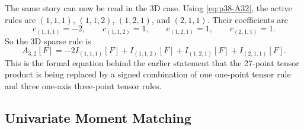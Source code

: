 \documentclass[11pt]{article}
\numberwithin{equation}{section}
\begin{document}
The same story can now be read in the 3D case.  Using
\eqref{eq:p38-A32}, the active rules are
\((1,1,1)\), \((1,1,2)\), \((1,2,1)\), and \((2,1,1)\).  Their coefficients are
\begin{equation}
  c_{(1,1,1)}=-2,
  \qquad
  c_{(1,1,2)}=1,
  \qquad
  c_{(1,2,1)}=1,
  \qquad
  c_{(2,1,1)}=1.
  \label{eq:p38-3d-smolyak-coeffs-repeat}
\end{equation}
So the 3D sparse rule is
\begin{equation}
  A_{3,2}[F]
  =
  -2I_{(1,1,1)}[F]+I_{(1,1,2)}[F]+I_{(1,2,1)}[F]+I_{(2,1,1)}[F].
  \label{eq:p38-3d-smolyak-rule}
\end{equation}
This is the formal equation behind the earlier statement that the 27-point tensor
product is being replaced by a signed combination of one one-point tensor rule
and three one-axis three-point tensor rules.

\subsection{Univariate Moment Matching}
\label{subsec:p32-univariate-moment-matching}
\end{document}
